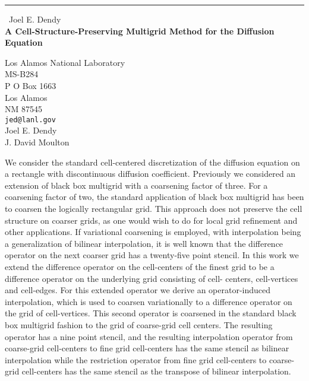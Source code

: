 \documentclass{report}
\begin{document}
\begin{center}
\rule{6in}{1pt} \
{\large Joel E. Dendy \\
{\bf A Cell-Structure-Preserving Multigrid Method for the Diffusion Equation}}

Los Alamos National Laboratory \\ MS-B284 \\ P O Box 1663 \\ Los Alamos \\ NM 87545
\\
{\tt jed@lanl.gov}\\
Joel E. Dendy\\
J. David Moulton\end{center}

We consider the standard cell-centered discretization of the
diffusion equation on a rectangle with discontinuous diffusion coefficient.
Previously we considered an extension of black box multigrid with a
coarsening factor of three. For a coarsening factor of two, the
standard application of black box multigrid has been to coarsen the
logically rectangular grid. This approach does not preserve the cell
structure on coarser grids, as one would wish to do for local grid
refinement and other applications. If variational coarsening is
employed, with interpolation being a generalization of bilinear
interpolation, it is well known that the difference operator on the
next coarser grid has a twenty-five point stencil. In this work we
extend the difference operator on the cell-centers of the finest grid
to be a difference operator on the underlying grid consisting of cell-
centers, cell-vertices and cell-edges. For this extended operator we
derive an operator-induced interpolation, which is used to coarsen
variationally to a difference operator on the grid of cell-vertices.
This second operator is coarsened in the standard black box multigrid
fashion to the grid of coarse-grid cell centers. The resulting
operator has a nine point stencil, and the resulting interpolation
operator from coarse-grid cell-centers to fine grid cell-centers has
the same stencil as bilinear interpolation while the restriction
operator from fine grid cell-centers to coarse-grid cell-centers has
the same stencil as the transpose of bilinear interpolation.
\end{document}
